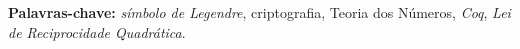 \begin{resumo}
        \textbf{Palavras-chave:} \textit{símbolo de Legendre}, criptografia, Teoria dos Números, \textit{Coq}, \textit{Lei de Reciprocidade Quadrática}.
\end{resumo}